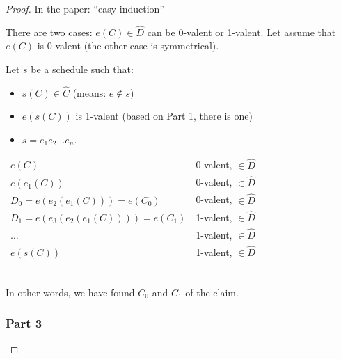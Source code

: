 \documentclass[12pt]{article}
\newcommand{\BI}{\begin{itemize}}
\newcommand{\EI}{\end{itemize}}
\begin{document}
\begin{proof}
In the paper: ``easy induction''

There are two cases: $e(C) \in \hat{D}$ can be 0-valent or 1-valent.
Let assume that $e(C)$ is 0-valent (the other case is symmetrical).

Let $s$ be a schedule such that:
\BI
\item $s(C) \in \hat{C}$ (means: $e \not\in s$)
\item $e(s(C))$ is 1-valent (based on Part 1, there is one)
\item $s=e_1 e_2 \ldots e_n$.
\EI

\begin{tabular}{ll}
$e(C)$					& 0-valent, $\in \hat{D}$ \\
$e(e_1(C))$				& 0-valent, $\in \hat{D}$ \\
$D_0=e(e_2(e_1(C))) = e(C_0)$		& 0-valent, $\in \hat{D}$ \\
$D_1=e(e_3(e_2(e_1(C)))) = e(C_1)$	& 1-valent, $\in \hat{D}$ \\
$\ldots$				& 1-valent, $\in \hat{D}$ \\
$e(s(C))$				& 1-valent, $\in \hat{D}$ \\
\end{tabular}
~\\

In other words, we have found $C_0$ and $C_1$ of the claim.

\newpage
\subsubsection*{Part 3}


\end{proof}
\end{document}
